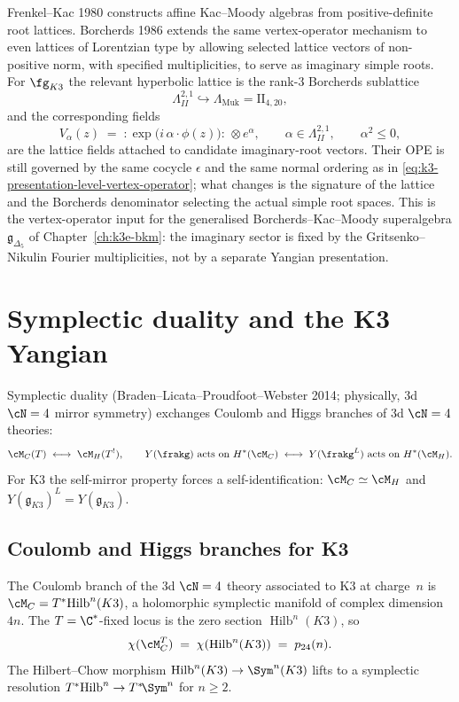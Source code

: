 \begin{remark}
\label{rem:k3-borcherds-hyperbolic-closure}
Frenkel--Kac 1980 constructs affine Kac--Moody algebras from positive-definite root
lattices. Borcherds 1986 extends the same vertex-operator mechanism to even lattices
of Lorentzian type by allowing selected lattice vectors of non-positive norm,
with specified multiplicities, to serve as imaginary simple roots. For
$\fg_{K3}$ the relevant hyperbolic lattice is the rank-$3$ Borcherds
sublattice
\[
 \Lambda_{II}^{2,1}
 \hookrightarrow
 \Lambda_{\mathrm{Muk}}=\mathrm{II}_{4,20},
\]
and the corresponding fields
\[
 V_\alpha(z)
 \;=\;
 {:}\exp\!\bigl(i\,\alpha\cdot\phi(z)\bigr){:}\,\otimes e^\alpha,
 \qquad
 \alpha\in\Lambda_{II}^{2,1},
 \qquad
 \alpha^2\leq 0,
\]
are the lattice fields attached to candidate imaginary-root vectors. Their OPE
is still governed by the same cocycle $\epsilon$ and the same normal ordering as
in \eqref{eq:k3-presentation-level-vertex-operator}; what changes is the
signature of the lattice and the Borcherds denominator selecting the actual
simple root spaces. This is the vertex-operator input for the generalised
Borcherds--Kac--Moody superalgebra $\mathfrak{g}_{\Delta_5}$ of
Chapter~\ref{ch:k3e-bkm}: the imaginary sector is fixed by the
Gritsenko--Nikulin Fourier multiplicities, not by a separate Yangian
presentation.
\end{remark}

\section{Symplectic duality and the K3 Yangian}
\label{sec:k3e-symplectic-duality}

Symplectic duality (Braden--Licata--Proudfoot--Webster 2014; physically, 3d $\cN = 4$ mirror symmetry) exchanges Coulomb and Higgs branches of 3d $\cN = 4$ theories:
\[
 \cM_C(T) \;\longleftrightarrow\; \cM_H(T^!),
 \qquad
 Y(\frakg)\text{ acts on }H^*(\cM_C)
 \;\longleftrightarrow\;
 Y(\frakg^L)\text{ acts on }H^*(\cM_H).
\]
For K3 the self-mirror property forces a self-identification: $\cM_C \simeq \cM_H$ and $Y(\mathfrak{g}_{K3})^L = Y(\mathfrak{g}_{K3})$.

\subsection{Coulomb and Higgs branches for K3}
\label{subsec:k3e-coulomb-higgs}

\begin{conjecture}
\label{conj:k3e-coulomb-branch}
\ClaimStatusConjectured
The Coulomb branch of the 3d $\cN = 4$ theory associated to K3 at charge~$n$ is $\cM_C = T^*\!\operatorname{Hilb}^n(K3)$, a holomorphic symplectic manifold of complex dimension~$4n$. The $T = \C^*$-fixed locus is the zero section $\operatorname{Hilb}^n(K3)$, so
\[
 \chi(\cM_C^T) \;=\; \chi(\operatorname{Hilb}^n(K3)) \;=\; p_{24}(n).
\]
The Hilbert--Chow morphism $\operatorname{Hilb}^n(K3) \to \Sym^n(K3)$ lifts to a symplectic resolution $T^*\!\operatorname{Hilb}^n \to T^*\!\Sym^n$ for $n \geq 2$.
\end{conjecture}

